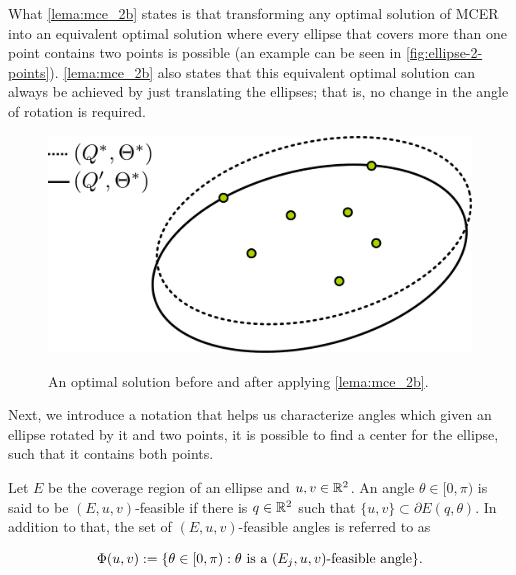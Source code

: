 What \autoref{lema:mce_2b} states is that transforming any optimal solution of MCER into an equivalent optimal solution where every ellipse that covers more than one point contains two points is possible (an example can be seen in \autoref{fig:ellipse-2-points}). \autoref{lema:mce_2b} also states that this equivalent optimal solution can always be achieved by just translating the ellipses; that is, no change in the angle of rotation is required. 

\begin{figure}
	\centering
	\caption{An optimal solution before and after applying \autoref{lema:mce_2b}.}
	\includegraphics[scale=.28]{tex/figures/ellipse-2-points}
	\fautor
	\label{fig:ellipse-2-points}
\end{figure}



Next, we introduce a notation that helps us characterize angles which given an ellipse rotated by it and two points, it is possible to find a center for the ellipse, such that it contains both points.

\begin{definicao}\label{def:feasible_angle}
	Let $E$ be the coverage region of an ellipse and $u, v \in \mathbb{R}^2$. An angle $\theta \in [0, \pi)$ is said to be $(E, u, v)$-feasible if there is $q \in \mathbb{R}^2$ such that $\{u, v\} \subset \partial E(q, \theta)$.
	In addition to that, the set of $(E, u, v)$-feasible angles is referred to as 
	
	\begin{equation}
	\Phi(u, v) := \{\theta \in [0, \pi) : \theta \textnormal{ is a } (E_j,u,v)\textnormal{-feasible angle}\}.
	\end{equation}
\end{definicao}

